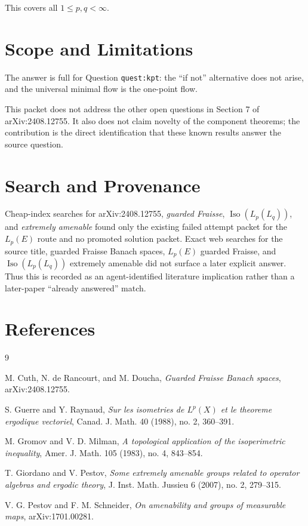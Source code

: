 \documentclass[11pt]{amsart}
\DeclareMathOperator{\Iso}{Iso}
\begin{document}
This covers all \(1\leq p,q<\infty\).

\section*{Scope and Limitations}

The answer is full for Question \texttt{quest:kpt}: the ``if not'' alternative
does not arise, and the universal minimal flow is the one-point flow.

This packet does not address the other open questions in Section 7 of
arXiv:2408.12755. It also does not claim novelty of the component theorems;
the contribution is the direct identification that these known results answer
the source question.

\section*{Search and Provenance}

Cheap-index searches for arXiv:2408.12755, \emph{guarded Fraisse},
\(\Iso(L_p(L_q))\), and \emph{extremely amenable} found only the existing failed
attempt packet for the \(L_p(E)\) route and no promoted solution packet.
Exact web searches for the source title, guarded Fraisse Banach spaces,
\(L_p(E)\) guarded Fraisse, and \(\Iso(L_p(L_q))\) extremely amenable did not
surface a later explicit answer. Thus this is recorded as an
agent-identified literature implication rather than a later-paper
``already answered'' match.

\section*{References}

\begin{thebibliography}{9}

M. Cuth, N. de Rancourt, and M. Doucha,
\emph{Guarded Fraisse Banach spaces}, arXiv:2408.12755.

S. Guerre and Y. Raynaud,
\emph{Sur les isometries de \(L^p(X)\) et le theoreme ergodique vectoriel},
Canad. J. Math. 40 (1988), no. 2, 360--391.

M. Gromov and V. D. Milman,
\emph{A topological application of the isoperimetric inequality},
Amer. J. Math. 105 (1983), no. 4, 843--854.

T. Giordano and V. Pestov,
\emph{Some extremely amenable groups related to operator algebras and
ergodic theory}, J. Inst. Math. Jussieu 6 (2007), no. 2, 279--315.

V. G. Pestov and F. M. Schneider,
\emph{On amenability and groups of measurable maps}, arXiv:1701.00281.

\end{thebibliography}
\end{document}
